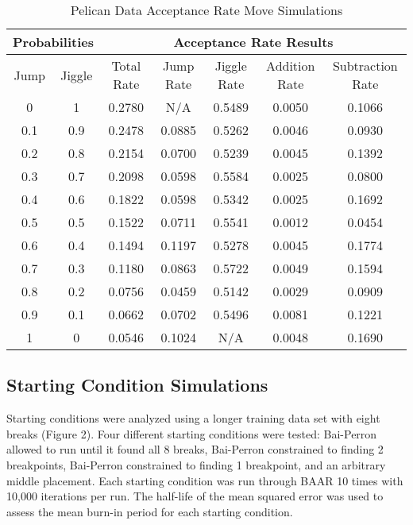 \documentclass[submit]{smj}
\begin{document}
\begin{table}[ht]
\caption{Pelican Data Acceptance Rate Move Simulations}
\begin{center}
\begin{tabular}{| c | c || c || c | c | c | c |}
 \hline
 \multicolumn{2}{|c||}{\textbf{Probabilities}}  &  \multicolumn{5}{|c|}{\textbf{Acceptance Rate Results}}\\ 
 \hline
 Jump & Jiggle &  Total Rate & Jump Rate & Jiggle Rate & Addition Rate & Subtraction Rate\\  
 \hline
 0 & 1 &  0.2780 & N/A & 0.5489 & 0.0050 & 0.1066 \\
 0.1 & 0.9 & 0.2478  & 0.0885 & 0.5262 & 0.0046 & 0.0930\\
 0.2 & 0.8 &  0.2154 & 0.0700 & 0.5239 & 0.0045 & 0.1392\\
 0.3 & 0.7 &  0.2098 & 0.0598 & 0.5584 & 0.0025 & 0.0800\\ 
 0.4 & 0.6 &  0.1822 &0.0598 & 0.5342 & 0.0025 & 0.1692\\
 0.5 & 0.5 &  0.1522 &  0.0711 & 0.5541 & 0.0012 & 0.0454\\
 0.6 & 0.4 &  0.1494 & 0.1197 & 0.5278 & 0.0045 & 0.1774\\
 0.7 & 0.3 &  0.1180 & 0.0863 & 0.5722 & 0.0049 & 0.1594\\ 
 0.8 & 0.2 &  0.0756 & 0.0459 & 0.5142 & 0.0029 & 0.0909 \\
 0.9 & 0.1 &  0.0662 &  0.0702 & 0.5496 & 0.0081 & 0.1221\\
 1 & 0 &  0.0546 &  0.1024 & N/A & 0.0048 & 0.1690\\
 \hline
\end{tabular}
\end{center}
\label{Pelican Move Simulation Results}
\end{table}


\subsection{Starting Condition Simulations}

Starting conditions were analyzed using a longer training data set with eight breaks (Figure 2). Four different starting conditions were tested: Bai-Perron allowed to run until it found all 8 breaks, Bai-Perron constrained to finding 2 breakpoints, Bai-Perron constrained to finding 1 breakpoint, and an arbitrary middle placement. Each starting condition was run through BAAR 10 times with 10,000 iterations per run. The half-life of the mean squared error was used to assess the mean burn-in period for each starting condition.
\end{document}
